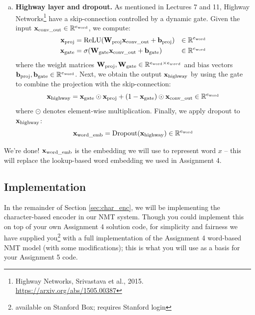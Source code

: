 \begin{enumerate}[(a)]
    \item \textbf{Highway layer and dropout.}
    As mentioned in Lectures 7 and 11, Highway Networks\footnote{Highway Networks, Srivastava et al., 2015. \url{https://arxiv.org/abs/1505.00387}} have a skip-connection controlled by a dynamic gate. Given the input $\mathbf{x}_\text{conv\_out} \in \mathbb{R}^{e_\text{word}}$, we compute:
    \begin{align}
        \mathbf{x}_{\text{proj}} &= \operatorname{ReLU}(\mathbf{W}_{\text{proj}} \mathbf{x}_\text{conv\_out} + \mathbf{b}_{\text{proj}}) &\in \mathbb{R}^{e_\text{word}} \\
        \mathbf{x}_{\text{gate}} &= \sigma(\mathbf{W}_\text{gate} \mathbf{x}_\text{conv\_out} + \mathbf{b}_\text{gate}) &\in \mathbb{R}^{e_\text{word}}
    \end{align}
    where the weight matrices $\mathbf{W}_\text{proj}, \mathbf{W}_\text{gate} \in \mathbb{R}^{e_\text{word} \times e_{word}}$ and bias vectors $\mathbf{b}_\text{proj}, \mathbf{b}_\text{gate} \in \mathbb{R}^{e_\text{word}}$. 
    Next, we obtain the output $\mathbf{x}_\text{highway}$ by using the gate to combine the projection with the skip-connection:
    \begin{equation}
    \mathbf{x}_\text{highway} = \mathbf{x}_\text{gate} \odot \mathbf{x}_\text{proj} + (1-\mathbf{x}_\text{gate}) \odot \mathbf{x}_\text{conv\_out} \in \mathbb{R}^{e_\text{word}}
    \end{equation}
    where $\odot$ denotes element-wise multiplication.
    Finally, we apply dropout to $\mathbf{x}_\text{highway}$:
    \begin{equation}
        \mathbf{x}_\text{word\_emb} = \text{Dropout}(\mathbf{x}_\text{highway}) \in \mathbb{R}^{e_\text{word}}
    \end{equation}
\end{enumerate}
We're done! $\mathbf{x}_\text{word\_emb}$ is the embedding we will use to represent word $x$ -- this will replace the lookup-based word embedding we used in Assignment 4.
\newpage

\subsection*{Implementation}
In the remainder of Section \ref{sec:char_enc}, we will be implementing the character-based encoder in our NMT system.
Though you could implement this on top of your own Assignment 4 solution code, for simplicity and fairness we have supplied you\footnote{available on Stanford Box; requires Stanford login} with a full implementation of the Assignment 4 word-based NMT model (with some modifications); this is what you will use as a basis for your Assignment 5 code. 

